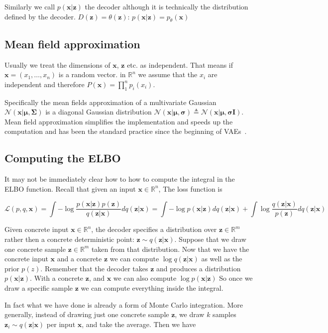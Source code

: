 \documentclass[11pt, a4paper]{report}
\theoremstyle{plain}
\theoremstyle{definition}
\theoremstyle{remark}
\newcommand{\R}{\mathbb{R}}
\newcommand{\x}{\mathbf{x}}
\newcommand{\z}{\mathbf{z}}
\newcommand{\LL}{\mathcal{L}}
\newcommand{\NN}{\mathcal{N}}
\newcommand{\bv}[1]{\boldsymbol{#1}}
\begin{document}
Similarly we call $p(\x | \z)$ the decoder although it is
technically the distribution defined by the decoder. $D(\z) = \theta(\z)$:
$p(\x | \z) = p_{\theta}(\x)$


\subsection{Mean field approximation}
Usually we treat the dimensions of $\x$, $\z$ etc. as independent. That means if
$\x = (x_1, \dots, x_n)$ is a random vector. in $\R^n$ we assume that the $x_i$
are independent and therefore $P(\x) = \prod_1^n p_i(x_i)$.

Specifically the mean fields approximation of a multivariate Gaussian
$\NN(\x | \bv{\mu}, \bv{\Sigma})$ is a diagonal Gaussian 
distribution 
$\NN(\x | \bv{\mu}, \bv{\sigma})
\triangleq \NN(\x | \bv{\mu}, \bv{\sigma}\bv{I})$.
Mean field approximation simplifies the implementation and speeds up the
computation and has been the standard practice since the
beginning of VAEs~\cite{kingma2013auto}.


\subsection{Computing the ELBO}
It may not be immediately clear how to how to compute the integral in the ELBO function. 
Recall that given an input $\x \in \R^n$,
The loss function is 

\begin{equation}
\LL(p,q,\x) = 
\int - \log \frac{p(\x|\z)p(\z)}{q(\z|\x)}dq(\z|\x)
= \int -\log p(\x|\z)dq(\z|\x) + \int \log \frac{q(\z|\x)}{p(\z)}dq(\z|\x)
\label{eq:elbovae}
\end{equation}

Given concrete input $\x \in \R^n$,
the decoder specifies a distribution over
$\z \in \R^m$ rather then a concrete deterministic point:
$\z \sim q(\z | \x)$. Suppose that we draw one concrete sample $\z \in \R^m$
taken from that distribution. Now that we have the concrete input $\x$ and a 
concrete $\z$ we can compute $\log q (\z | \x)$ as well as the prior $p(z)$.
Remember that the decoder takes $\z$ and produces a distribution $p(\x | \z)$.
With a concrete $\z$, and $\x$ we can also compute $\log p(\x | \z)$
So once we draw a specific sample $\z$ we can compute everything inside the
integral.

In fact what we have done is already a form of Monte Carlo integration.
More generally, instead of drawing just one concrete sample $\z$, we draw $k$ samples
$\z_i \sim q(\z | \x)$ per input $\x$, and take the average. Then we have
\end{document}
